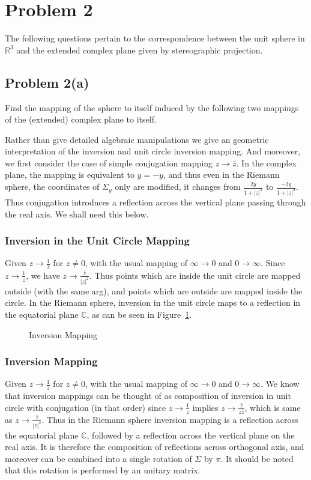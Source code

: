 \documentclass{article}[12pt]
\def\to{\rightarrow}
\def\CC{\mathbb C}
\def\RR{\mathbb R}
\begin{document}
\section{Problem 2}
The following questions pertain to the correspondence between the unit
sphere in $\RR^3$ and the extended complex plane given by stereographic
projection.
\subsection{Problem 2(a)}
Find the mapping of the sphere to itself induced by the following two
mappings of the (extended) complex plane to itself. 

Rather than give detailed algebraic manipulations we give an 
geometric interpretation of the inversion and unit circle inversion
mapping. And moreover, we first consider the case of simple conjugation
mapping $z\to\bar{z}$. %
In the complex plane, the mapping is equivalent to $y=-y$, and thus
even in the Riemann sphere, the coordinates of $\Sigma_y$ only are
modified, it changes from $\frac{2y}{1+|z|^2}$ to $\frac{-2y}{1+|z|^2}$.
Thus conjugation introduces a reflection across the vertical plane 
passing through the
real axis. We shall need this below.


\subsubsection{Inversion in the Unit Circle Mapping}
Given $z\to \frac{1}{\bar{z}}$ for $z\ne 0$, with the usual mapping of
$\infty\to 0$ and $0\to\infty$.
Since $z\to \frac{1}{\bar{z}}$, we have $z\to \frac{\bar\bar{z}}{|z|^2}$.
Thus points which are inside
the unit circle are mapped outside (with the same arg), and points
which are outside are mapped inside the circle. In the Riemann sphere,
inversion in the unit circle maps to a reflection in the equatorial
plane $\CC$, as can be seen in Figure~\ref{fig:equator}.

\begin{figure}
\vspace{5cm}
\caption{Inversion Mapping}
\label{fig:equator}
\end{figure}

\subsubsection{Inversion Mapping}
Given $z\to \frac{1}{z}$ for $z\ne 0$, with the usual mapping of
$\infty\to 0$ and $0\to\infty$.
We know that inversion mappings can be thought of as composition
of inversion in unit circle with conjugation (in that order) since
$z\to \frac{1}{z}$ implies $z\to \frac{\bar{z}}{z\bar{z}}$, which is
same as $z\to\frac{\bar{z}}{|z|^2}$. Thus in the Riemann sphere
inversion mapping is a reflection across the equatorial plane $\CC$, followed
by a reflection across the vertical plane on the real axis. It is therefore
the composition of reflections across orthogonal axis, and moreover
can be combined into a single rotation of $\Sigma$ by $\pi$. It should
be noted that this rotation is performed by an unitary matrix.
\end{document}
